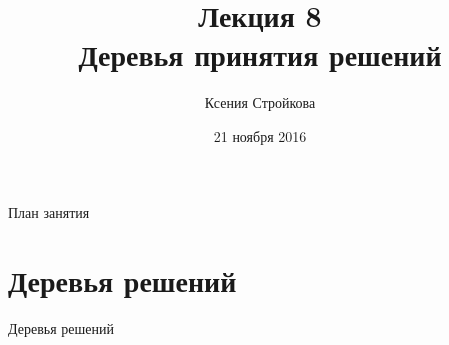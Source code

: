 \documentclass[aspectratio=169]{beamer}
\date{21 ноября 2016}
\author{Ксения Стройкова}
\title{\newline \newline \newline Лекция 8 \\ Деревья принятия решений}
\let\otp\titlepage
\renewcommand{\titlepage}{\otp\addtocounter{framenumber}{-1}}
\begin{document}
\begin{frame}[plain]
\titlepage
\end{frame}

\begin{frame}{План занятия}
\tableofcontents
\end{frame}

\section{Деревья решений}

\begin{frame}{}

\begin{center}
\Large Деревья решений
\end{center}

\end{frame}
\end{document}
